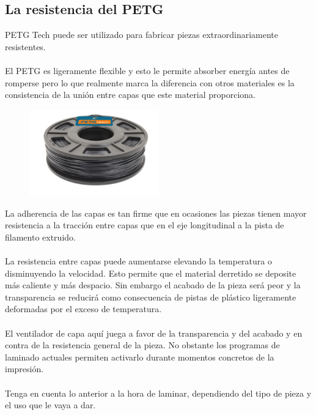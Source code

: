 \documentclass[11pt,a4paper]{article}
\begin{document}
	\subsection{La resistencia del PETG}PETG Tech puede ser utilizado para fabricar piezas extraordinariamente resistentes.
\\\\
El PETG es ligeramente flexible y esto le permite absorber energía antes de romperse pero lo que realmente marca la diferencia con otros materiales es la consistencia de la unión entre capas que este material proporciona.
\begin{figure}[H]
\centering
\includegraphics[width=0.5\textwidth,cfbox=azul_marcos 1pt 0pt]{FOTOS/PETG250NEGRO}
\end{figure}
La adherencia de las capas es tan firme que en ocasiones las piezas tienen mayor resistencia a la tracción entre capas que en el eje longitudinal a la pista de filamento extruido.
\\\\La resistencia entre capas puede aumentarse elevando la temperatura o disminuyendo la velocidad. Esto permite que el material derretido se deposite más caliente y más despacio. Sin embargo el acabado de la pieza será peor y la transparencia se reducirá como consecuencia de pistas de plástico ligeramente deformadas por el exceso de temperatura.
\\\\El ventilador de capa aquí juega a favor de la transparencia y del acabado y en contra de la resistencia general de la pieza. No obstante los programas de laminado actuales permiten activarlo durante momentos concretos de la impresión.
\\\\Tenga en cuenta lo anterior a la hora de laminar, dependiendo del tipo de pieza y el uso que le vaya a dar.
\end{document}
